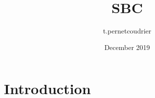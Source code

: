 \documentclass{article}
\title{SBC}
\author{t.pernetcoudrier }
\date{December 2019}
\begin{document}
\maketitle

\section{Introduction}
\end{document}
